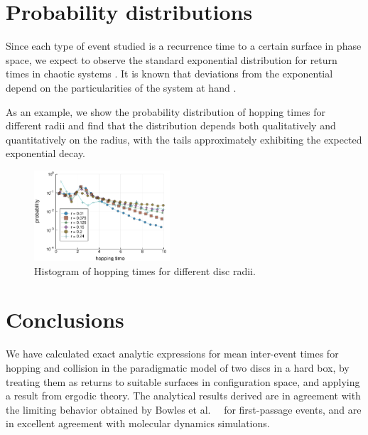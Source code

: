 \documentclass[superscriptaddress,pre,reprint,showpacs,twocolumn]{revtex4-1}
\newcommand{\etal}{et al.\ }
\begin{document}
%
\section{Probability distributions}

Since each type of event studied is a recurrence time to a
certain surface in phase space, we expect to observe the standard
exponential distribution for return times in chaotic systems
\cite{Hirata1999}. It is known that deviations from the
exponential depend on the particularities of the system at hand
\cite{Altmann2005}.


As an example, we show
the probability distribution of hopping times for different radii and find that the
distribution depends both qualitatively and quantitatively on the
radius, with the tails approximately exhibiting the expected exponential decay.

\begin{figure}[h]
  \centering
  \includegraphics[width=0.45\textwidth]{figures/histogram_hopping_times.pdf}
  \caption{Histogram of hopping times for different disc radii.}
    \label{histogram_hopping}
\end{figure}


\section{Conclusions}

We have calculated exact analytic expressions for mean inter-event times for hopping and
collision in the paradigmatic model of two discs in a hard box,
by treating them as returns to suitable surfaces in configuration space, %
and applying a result from ergodic theory.
The analytical results derived 
are in agreement with  the limiting behavior obtained
by Bowles \etal~\cite{Bowles04} for first-passage events, and are in excellent agreement with molecular
dynamics simulations.
\end{document}
